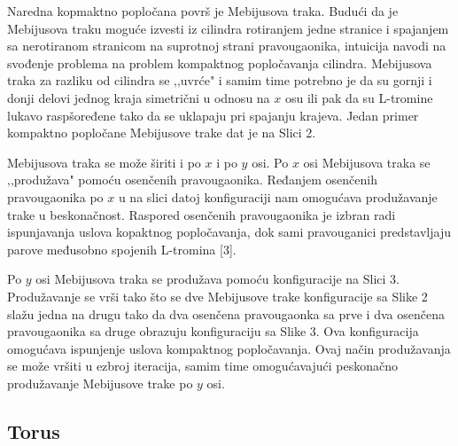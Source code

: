Naredna kopmaktno popločana površ je Mebijusova traka. Budući da je Mebijusova traku moguće izvesti iz cilindra rotiranjem jedne stranice i spajanjem sa nerotiranom stranicom na suprotnoj strani pravougaonika, intuicija navodi na svođenje problema na problem kompaktnog popločavanja cilindra. Mebijusova traka za razliku od cilindra se ‚‚uvrće" i samim time potrebno je da su gornji i donji delovi jednog kraja simetrični u odnosu na $x$ osu ili pak da su L-tromine lukavo raspšoređene tako da se uklapaju pri spajanju krajeva. Jedan primer kompaktno popločane Mebijusove trake dat je na Slici 2.

Mebijusova traka se može širiti i po $x$ i po $y$ osi. Po $x$ osi Mebijusova traka se ‚‚produžava" pomoću osenčenih pravougaonika. Ređanjem osenčenih pravougaonika po $x$ u na slici datoj konfiguraciji nam omogućava produžavanje trake u beskonačnost. Raspored osenčenih pravougaonika je izbran radi ispunjavanja uslova kopaktnog popločavanja, dok sami pravouganici predstavljaju parove međusobno spojenih L-tromina [3].

Po $y$ osi Mebijusova traka se produžava pomoću konfiguracije na Slici 3. Produžavanje se vrši tako što se dve Mebijusove trake konfiguracije sa Slike 2 slažu jedna na drugu tako da dva osenčena pravougaonka sa prve i dva osenčena pravougaonika sa druge obrazuju konfiguraciju sa Slike 3. Ova konfiguracija omogućava ispunjenje uslova kompaktnog popločavanja. Ovaj način produžavanja se može vršiti u ezbroj iteracija, samim time omogućavajući peskonačno produžavanje Mebijusove trake po $y$ osi.


\subsection{Torus}

